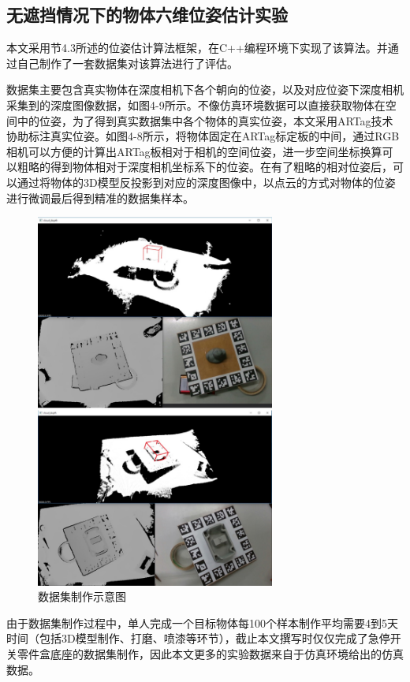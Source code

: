 \subsection{无遮挡情况下的物体六维位姿估计实验}

本文采用节4.3所述的位姿估计算法框架，在C++编程环境下实现了该算法。并通过自己制作了一套数据集对该算法进行了评估。

数据集主要包含真实物体在深度相机下各个朝向的位姿，以及对应位姿下深度相机采集到的深度图像数据，如图4-9所示。不像仿真环境数据可以直接获取物体在空间中的位姿，为了得到真实数据集中各个物体的真实位姿，本文采用ARTag技术协助标注真实位姿。如图4-8所示，将物体固定在ARTag标定板的中间，通过RGB相机可以方便的计算出ARTag板相对于相机的空间位姿，进一步空间坐标换算可以粗略的得到物体相对于深度相机坐标系下的位姿。在有了粗略的相对位姿后，可以通过将物体的3D模型反投影到对应的深度图像中，以点云的方式对物体的位姿进行微调最后得到精准的数据集样本。
\begin{figure}[htb]
	\centering 
	\includegraphics[width=0.7\textwidth]{./mypic/数据集制作2.jpg} 
	\caption{数据集制作示意图} 
\end{figure}

由于数据集制作过程中，单人完成一个目标物体每100个样本制作平均需要4到5天时间（包括3D模型制作、打磨、喷漆等环节），截止本文撰写时仅仅完成了急停开关零件盒底座的数据集制作，因此本文更多的实验数据来自于仿真环境给出的仿真数据。

